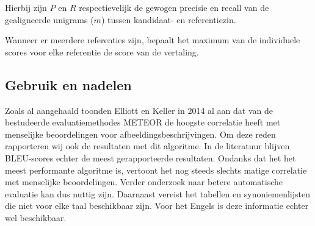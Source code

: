 Hierbij zijn $P$ en $R$ respectievelijk de gewogen precisie en recall van de gealigneerde unigrams ($m$) tussen kandidaat- en referentiezin.

Wanneer er meerdere referenties zijn, bepaalt het maximum van de individuele scores voor elke referentie de score van de vertaling.

\subsection{Gebruik en nadelen}
Zoals al aangehaald toonden Elliott en Keller in 2014 al aan dat van de bestudeerde evaluatiemethodes METEOR de hoogste correlatie heeft met menselijke beoordelingen voor afbeeldingsbeschrijvingen. Om deze reden rapporteren wij ook de resultaten met dit algoritme. In de literatuur blijven BLEU-scores echter de meest gerapporteerde resultaten.
Ondanks dat het het meest performante algoritme is, vertoont het nog steeds slechts matige correlatie met menselijke beoordelingen. Verder onderzoek naar betere automatische evaluatie kan dus nuttig zijn. Daarnaast vereist het tabellen en synoniemenlijsten die niet voor elke taal beschikbaar zijn. Voor het Engels is deze informatie echter wel beschikbaar. 


